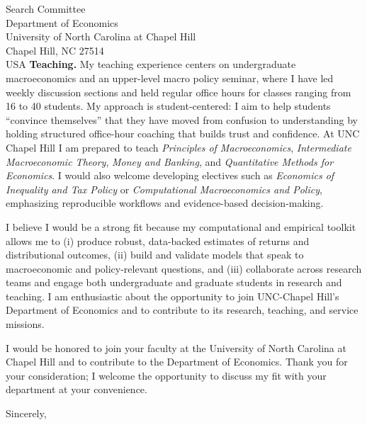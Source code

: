 \documentclass[11pt,letterpaper]{letter}
\begin{document}
\begin{letter}{Search Committee \\
Department of Economics \\
University of North Carolina at Chapel Hill \\
Chapel Hill, NC 27514 \\ USA}
\textbf{Teaching.} My teaching experience centers on undergraduate macroeconomics and an upper-level macro policy seminar, where I have led weekly discussion sections and held regular office hours for classes ranging from 16 to 40 students. My approach is student-centered: I aim to help students “convince themselves” that they have moved from confusion to understanding by holding structured office-hour coaching that builds trust and confidence. At UNC Chapel Hill I am prepared to teach \textit{Principles of Macroeconomics}, \textit{Intermediate Macroeconomic Theory}, \textit{Money and Banking}, and \textit{Quantitative Methods for Economics}. I would also welcome developing electives such as \textit{Economics of Inequality and Tax Policy} or \textit{Computational Macroeconomics and Policy}, emphasizing reproducible workflows and evidence-based decision-making.

I believe I would be a strong fit because my computational and empirical toolkit allows me to (i) produce robust, data-backed estimates of returns and distributional outcomes, (ii) build and validate models that speak to macroeconomic and policy-relevant questions, and (iii) collaborate across research teams and engage both undergraduate and graduate students in research and teaching. I am enthusiastic about the opportunity to join UNC-Chapel Hill’s Department of Economics and to contribute to its research, teaching, and service missions.

I would be honored to join your faculty at the University of North Carolina at Chapel Hill and to contribute to the Department of Economics. Thank you for your consideration; I welcome the opportunity to discuss my fit with your department at your convenience.

\closing{Sincerely,}

\end{letter}
\end{document}
